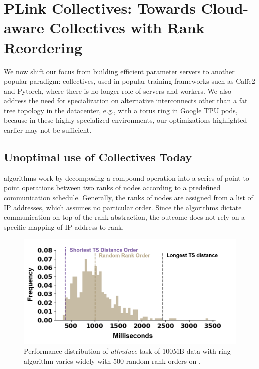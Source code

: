 \chapter{PLink Collectives: Towards Cloud-aware Collectives with Rank Reordering}
We now shift our focus from building efficient parameter servers to another popular paradigm: collectives, used in popular training frameworks such as Caffe2 and Pytorch, where there is no longer role of servers and workers. We also address the need for specialization on alternative interconnects other than a fat tree topology in the datacenter, e.g., with a torus ring in Google TPU pods, because in these highly specialized environments, our optimizations highlighted earlier may not be sufficient. 


\section{Unoptimal use of Collectives Today}
\mpi algorithms work by decomposing a compound operation into a series of point to point operations between two ranks of nodes according to a predefined communication schedule. Generally, the ranks of nodes are assigned from a list of IP addresses, which assumes no particular order. Since the \mpi algorithms dictate communication on top of the rank abstraction, the outcome does not rely on a specific mapping of IP address to rank.

\begin{figure}[h!]
	\centering
	\includegraphics[width=.5\linewidth, trim=8 3 14 14,clip]{Figures/azringperformance.png}
	\caption{Performance distribution of \textit{allreduce} task of 100MB data with ring algorithm varies widely with 500 random rank orders on \azure.}
	\label{fig:azringperformance}
\end{figure}


